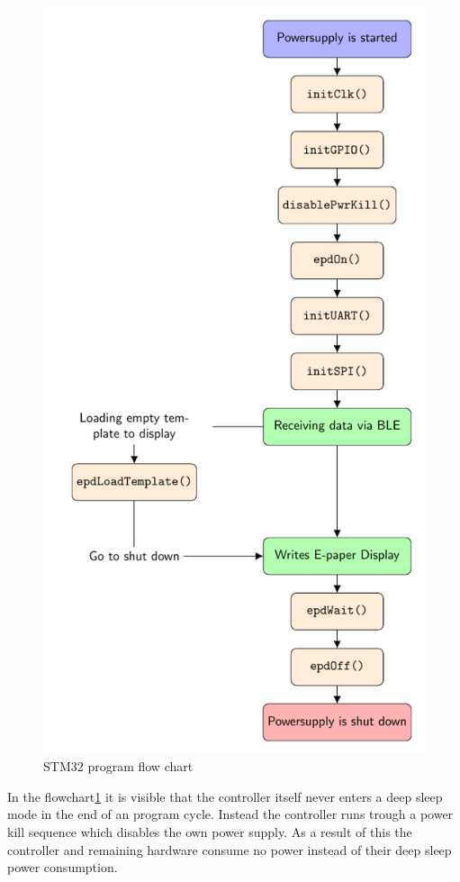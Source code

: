 \begin{figure}[H]
	\centering
	\includegraphics[height=0.8\textheight]{4-development/software/graphics/main.pdf}
	\caption{STM32 program flow chart\label{software:main}}
\end{figure}
In the flowchart\ref{software:main} it is visible that the controller itself never enters a deep sleep mode in the end of an program cycle. Instead the controller runs trough a power kill sequence which disables the own power supply. As a result of this the controller and remaining hardware consume no power instead of their deep sleep power consumption. 

